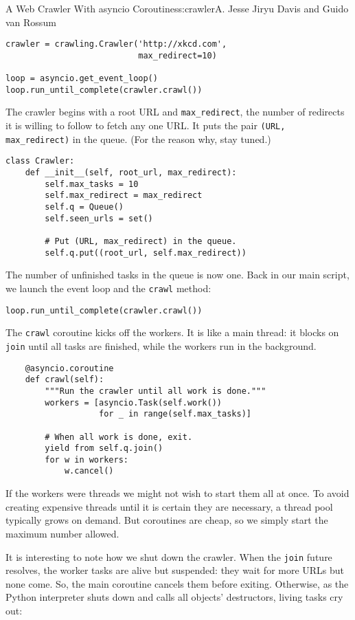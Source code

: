 \begin{aosachapter}{A Web Crawler With asyncio Coroutines}{s:crawler}{A. Jesse Jiryu Davis and Guido van Rossum}
\begin{verbatim}
crawler = crawling.Crawler('http://xkcd.com',
                           max_redirect=10)

loop = asyncio.get_event_loop()
loop.run_until_complete(crawler.crawl())
\end{verbatim}

The crawler begins with a root URL and \texttt{max\_redirect}, the
number of redirects it is willing to follow to fetch any one URL. It
puts the pair \texttt{(URL, max\_redirect)} in the queue. (For the
reason why, stay tuned.)

\begin{verbatim}
class Crawler:
    def __init__(self, root_url, max_redirect):
        self.max_tasks = 10
        self.max_redirect = max_redirect
        self.q = Queue()
        self.seen_urls = set()
        
        # Put (URL, max_redirect) in the queue.
        self.q.put((root_url, self.max_redirect))
\end{verbatim}

The number of unfinished tasks in the queue is now one. Back in our main
script, we launch the event loop and the \texttt{crawl} method:

\begin{verbatim}
loop.run_until_complete(crawler.crawl())
\end{verbatim}

The \texttt{crawl} coroutine kicks off the workers. It is like a main
thread: it blocks on \texttt{join} until all tasks are finished, while
the workers run in the background.

\begin{verbatim}
    @asyncio.coroutine
    def crawl(self):
        """Run the crawler until all work is done."""
        workers = [asyncio.Task(self.work())
                   for _ in range(self.max_tasks)]

        # When all work is done, exit.
        yield from self.q.join()
        for w in workers:
            w.cancel()
\end{verbatim}

If the workers were threads we might not wish to start them all at once.
To avoid creating expensive threads until it is certain they are
necessary, a thread pool typically grows on demand. But coroutines are
cheap, so we simply start the maximum number allowed.

It is interesting to note how we shut down the crawler. When the
\texttt{join} future resolves, the worker tasks are alive but suspended:
they wait for more URLs but none come. So, the main coroutine cancels
them before exiting. Otherwise, as the Python interpreter shuts down and
calls all objects' destructors, living tasks cry out:


\end{aosachapter}
